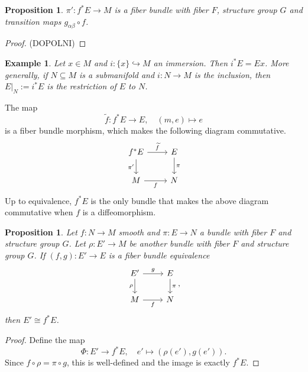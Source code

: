 \documentclass[10pt, a4paper]{article}
\newtheorem{proposition}[thm]{Proposition}
\newtheorem{example}[thm]{Example}
\newenvironment{noticeC}{%
  \tcolorbox[%
  notitle,
  empty,
  enhanced,  %
  breakable,
  coltext=black, 
  fontupper=\rmfamily,
  noparskip,
  sharp corners,
  boxrule=-1pt,  %
  frame hidden,
  left=7pt,  %
  right=7pt,
  top=5pt,
  bottom=5pt,
  before skip=2.5ex plus 2pt,
  after skip=2.5ex plus 2pt,
  overlay unbroken and last={%
  },
  ]}
{\endtcolorbox}
\newenvironment{myproof}%
  {\begin{noticeC}\begin{proof}}%
  {\end{proof}\end{noticeC}}
\begin{document}
\begin{proposition}
  $\pi': f^* E \to M$ is a fiber bundle with fiber $F$, structure group $G$ and transition maps $g_{\alpha \beta} \circ f$.
\end{proposition}

\begin{myproof}
  (DOPOLNI)
\end{myproof}

\begin{example}
  Let $x \in M$ and $i: \{x \} \hookrightarrow M$ an immersion.
  Then $i^* E = Ex$. More generally, if $N \subseteq M$ is a submanifold 
  and $i: N \to M$ is the inclusion, then $E \big|_N := i^* E$ is the restriction of $E$ to $N$.
\end{example}

The map $$\widetilde{f}: f^* E \to E,\quad (m, e) \mapsto e$$
is a fiber bundle morphism, which makes the following diagram commutative.
\[\begin{tikzcd}
	{f^* E} & E \\
	M & N
	\arrow["{\widetilde{f}}", from=1-1, to=1-2]
	\arrow["{\pi'}"', from=1-1, to=2-1]
	\arrow["\pi", from=1-2, to=2-2]
	\arrow["f"', from=2-1, to=2-2]
\end{tikzcd}\]
Up to equivalence, $f^* E$ is the only bundle that makes the above diagram commutative when $f$ is a diffeomorphism.

\begin{proposition}
  Let $f: N \to M$ smooth and $\pi: E \to N$ a bundle with fiber $F$ and structure group $G$.
  Let $\rho: E' \to M$ be another bundle with fiber $F$ and structure group $G$.
  If $(f, g) : E' \to E$ is a fiber bundle equivalence
\[\begin{tikzcd}
	{E'} & E \\
	M & N
	\arrow["g", from=1-1, to=1-2]
	\arrow["\rho"', from=1-1, to=2-1]
	\arrow["\pi", from=1-2, to=2-2]
	\arrow["f"', from=2-1, to=2-2]
\end{tikzcd},\]
  then $E' \cong f^* E$.
\end{proposition}

\begin{myproof}
  Define the map 
  $$\Phi: E' \to f^* E,\quad e' \mapsto (\rho(e'), g(e')).$$
  Since $f \circ \rho = \pi \circ g$, this is well-defined and the image is exactly $f^* E$.
\end{myproof}
\end{document}
